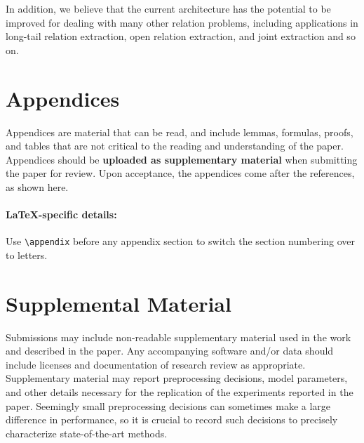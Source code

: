 \documentclass[11pt,a4paper]{article}
\begin{document}
In addition, we believe that the current architecture has the potential to be improved for dealing with many other relation problems, including applications in long-tail relation extraction, open relation extraction, and joint extraction and so on. 

\iffalse
\section*{Acknowledgments}

The acknowledgments should go immediately before the references. Do not number the acknowledgments section.
Do not include this section when submitting your paper for review.
\fi




\iffalse
\appendix

\section{Appendices}
\label{sec:appendix}
Appendices are material that can be read, and include lemmas, formulas, proofs, and tables that are not critical to the reading and understanding of the paper. 
Appendices should be \textbf{uploaded as supplementary material} when submitting the paper for review.
Upon acceptance, the appendices come after the references, as shown here.

\paragraph{\LaTeX-specific details:}
Use {\small\verb|\appendix|} before any appendix section to switch the section numbering over to letters.


\section{Supplemental Material}
\label{sec:supplemental}
Submissions may include non-readable supplementary material used in the work and described in the paper.
Any accompanying software and/or data should include licenses and documentation of research review as appropriate.
Supplementary material may report preprocessing decisions, model parameters, and other details necessary for the replication of the experiments reported in the paper.
Seemingly small preprocessing decisions can sometimes make a large difference in performance, so it is crucial to record such decisions to precisely characterize state-of-the-art methods. 
\end{document}
